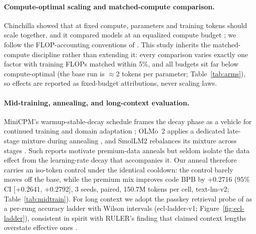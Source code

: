 \paragraph{Compute-optimal scaling and matched-compute comparison.}
Chinchilla showed that at fixed compute, parameters and training tokens should scale together, and it compared models at an equalized compute budget \citep{hoffmann2022training}; we follow the FLOP-accounting conventions of \citet{chowdhery2022palm}. This study inherits the matched-compute discipline rather than extending it: every comparison varies exactly one factor with training FLOPs matched within 5\%, and all budgets sit far below compute-optimal (the base run is $\approx$2 tokens per parameter; Table~\ref{tab:arms}), so effects are reported as fixed-budget attributions, never scaling laws.

\paragraph{Mid-training, annealing, and long-context evaluation.}
MiniCPM's warmup-stable-decay schedule frames the decay phase as a vehicle for continued training and domain adaptation \citep{hu2024minicpm}; OLMo~2 applies a dedicated late-stage mixture during annealing \citep{olmo20242}, and SmolLM2 rebalances its mixture across stages \citep{allal2025smollm2}. Such reports motivate premium-data anneals but seldom isolate the data effect from the learning-rate decay that accompanies it. Our anneal therefore carries an iso-token control under the identical cooldown: the control barely moves off the base, while the premium mix improves code BPB by +0.2716 (95\% CI [+0.2641, +0.2792], 3 seeds, paired, 150.7M tokens per cell, text-lm-v2; Table~\ref{tab:midtrain}). For long context we adopt the passkey retrieval probe of \citet{mohtashami2023landmark} as a per-rung accuracy ladder with Wilson intervals (ecl-ladder-v1; Figure~\ref{fig:ecl-ladder}), consistent in spirit with RULER's finding that claimed context lengths overstate effective ones \citep{hsieh2024ruler}.

